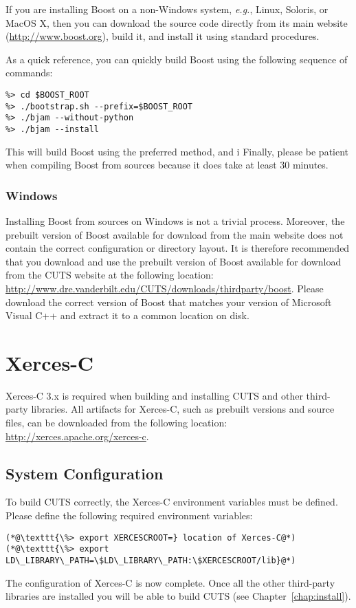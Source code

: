 If you are installing Boost on a non-Windows system, \textit{e.g.}, Linux, 
Soloris, or MacOS X, then you can download the source code directly from its
main website (\url{http://www.boost.org}), build it, and install it using
standard procedures.

As a quick reference, you can quickly build Boost using the following
sequence of commands:
\begin{lstlisting}
%> cd $BOOST_ROOT
%> ./bootstrap.sh --prefix=$BOOST_ROOT
%> ./bjam --without-python
%> ./bjam --install
\end{lstlisting}
This will build Boost using the preferred method, and i
Finally, please be patient when compiling Boost from sources 
because it does take at least 30 minutes. 

\subsubsection{Windows}

Installing Boost from sources on Windows is not a trivial process. 
Moreover, the prebuilt version of Boost available for download from 
the main website does not contain the correct configuration or directory
layout. It is therefore recommended that you download and use the prebuilt 
version of Boost available for download from the CUTS website at the 
following location:
\url{http://www.dre.vanderbilt.edu/CUTS/downloads/thirdparty/boost}. Please download
the correct version of Boost that matches your version of Microsoft Visual
C++ and extract it to a common location on disk.

\section{Xerces-C}
\label{sec:thirdparty-xercesc}

Xerces-C 3.x is required when building and installing CUTS and other third-party
libraries. All artifacts for Xerces-C, such as prebuilt versions and source files, 
can be downloaded from the following location: \url{http://xerces.apache.org/xerces-c}. 

\subsection{System Configuration}

To build CUTS correctly, the Xerces-C environment variables must be defined. Please 
define the following required environment variables:
\begin{lstlisting}
(*@\texttt{\%> export XERCESCROOT=} location of Xerces-C@*)
(*@\texttt{\%> export LD\_LIBRARY\_PATH=\$LD\_LIBRARY\_PATH:\$XERCESCROOT/lib}@*)
\end{lstlisting}
The configuration of Xerces-C is now complete. Once all the other
third-party libraries are installed you will be able to build CUTS
(see Chapter~\ref{chap:install}).

